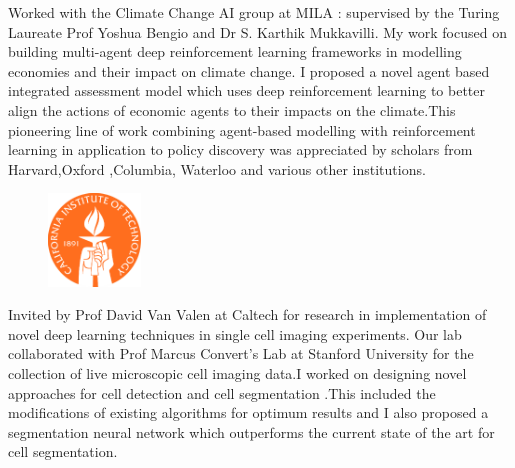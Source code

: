 \documentclass[]{deedy-resume-openfont}
\begin{document}
\begin{minipage}[t]{0.66\textwidth}
Worked with the Climate Change AI group at MILA : supervised by the Turing Laureate Prof Yoshua Bengio and Dr S. Karthik Mukkavilli. My work focused on building multi-agent deep reinforcement learning frameworks in modelling economies and their impact on climate change. I proposed a novel agent based integrated assessment model which uses deep reinforcement learning to better align the actions of economic agents to their impacts on the climate.This pioneering line of work combining agent-based modelling with reinforcement learning in application to policy discovery was appreciated by scholars from Harvard,Oxford ,Columbia, Waterloo and various other institutions.  
\newline
\sectionsep

\begin{figure}
  \begin{center}
    \includegraphics[width=0.22\textwidth]{caltechlogo.png}
  \end{center}
\end{figure}
Invited by Prof David Van Valen at Caltech for research in implementation of novel deep learning techniques in single cell imaging experiments. Our lab collaborated with Prof Marcus Convert's Lab at Stanford University for the collection of live microscopic cell imaging data.I worked on designing novel approaches for cell detection and cell segmentation .This included the modifications of existing algorithms for optimum results and I also proposed a segmentation neural network which outperforms the current state of the art for cell segmentation.
\newline
\sectionsep


\end{minipage}
\end{document}
